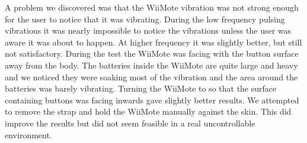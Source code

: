 A problem we discovered was that the WiiMote vibration was not strong enough for the user to notice that it was vibrating. During the low frequency pulsing vibrations it was nearly impossible to notice the vibrations unless the user was aware it was about to happen. At higher frequency it was slightly better, but still not satisfactory. During the test the WiiMote was facing with the button surface away from the body. The batteries inside the WiiMote are quite large and heavy and we noticed they were soaking most of the vibration and the area around the batteries was barely vibrating. Turning the WiiMote to  so that the surface containing buttons was facing inwards gave slightly better results. We attempted to remove the strap and hold the WiiMote manually against the skin. This did improve the results but did not seem feasible in a real uncontrollable environment.